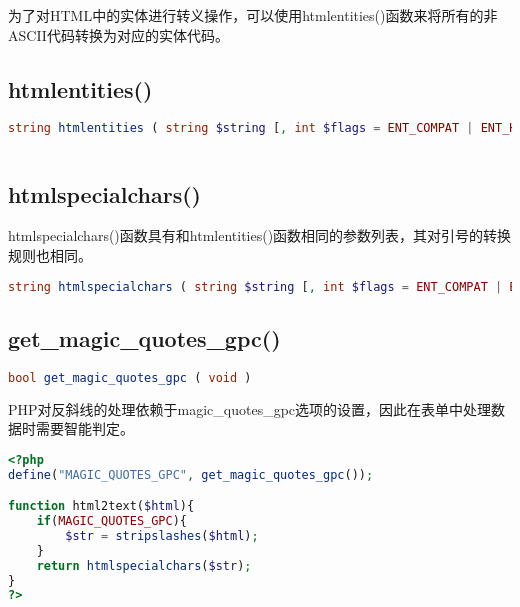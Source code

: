 为了对HTML中的实体进行转义操作，可以使用htmlentities()函数来将所有的非ASCII代码转换为对应的实体代码。

\subsection{htmlentities()}





\begin{lstlisting}[language=PHP]
string htmlentities ( string $string [, int $flags = ENT_COMPAT | ENT_HTML401 [, string $encoding = ini_get("default_charset") [, bool $double_encode = true ]]] )
\end{lstlisting}


\begin{lstlisting}[language=PHP]

\end{lstlisting}


\subsection{htmlspecialchars()}

htmlspecialchars()函数具有和htmlentities()函数相同的参数列表，其对引号的转换规则也相同。



\begin{lstlisting}[language=PHP]
string htmlspecialchars ( string $string [, int $flags = ENT_COMPAT | ENT_HTML401 [, string $encoding = ini_get("default_charset") [, bool $double_encode = true ]]] )
\end{lstlisting}

\subsection{get\_magic\_quotes\_gpc()}




\begin{lstlisting}[language=PHP]
bool get_magic_quotes_gpc ( void )
\end{lstlisting}

PHP对反斜线的处理依赖于magic\_quotes\_gpc选项的设置，因此在表单中处理数据时需要智能判定。


\begin{lstlisting}[language=PHP]
<?php
define("MAGIC_QUOTES_GPC", get_magic_quotes_gpc());

function html2text($html){
	if(MAGIC_QUOTES_GPC){
		$str = stripslashes($html);
	}
	return htmlspecialchars($str);
}
?>
\end{lstlisting}




